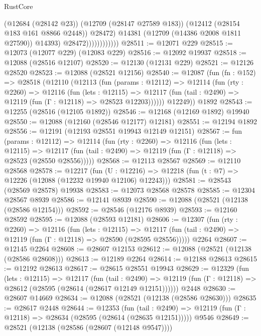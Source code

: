\begin{lexlean}{RustCore}
\begin{coremodule}
                                (@12684 (@28142 @23))
                                (@12709 (@28147 @27589 @183))
                                (@12412 (@28154 @183 @161 @8866 @2448))
                                @28472)
                              @14381
                              (@12709 (@14386 @2008 @1811 @27590))
                              @14393)
                            @28472))))))))))))
@28511 := @12071 @229
@28515 := @12073 (@12077 @229) (@12083 @229)
@28516 := @12092 @19937
@28518 := @12088 (@28516 @12107)
@28520 := @12130 (@12131 @229)
@28521 := @12126 @28520
@28523 := @12088 (@28521 @12156)
@28540 := @12087
    (fun (fn : @152) =>
    @28518
      (@12110
        (@12113
          (fun (params : @12112) =>
          @12114
            (fun (rty : @2260) =>
            @12116
              (fun (lets : @12115) =>
              @12117 (fun (tail : @2490) => @12119 (fun (Γ : @12118) => @28523 @12203))))))
        @12249))
    @1892
@28543 := @12255 (@28516 (@12105 @1892))
@28546 := @12168 (@12169 @1892) @19940
@28550 := @12088 (@12160 (@28546 @12177) @12181)
@28551 := @12194 @1892
@28556 := @12191 (@12193 @28551 @19943 @12149 @12151)
@28567 := fun (params : @12112) =>
  @12114
    (fun (rty : @2260) =>
    @12116
      (fun (lets : @12115) =>
      @12117 (fun (tail : @2490) => @12119 (fun (Γ : @12118) => @28523 (@28550 @28556)))))
@28568 := @12113 @28567
@28569 := @12110 @28568
@28578 := @12217
    (fun (U : @12216) => @12218 (fun (t : @7) => @12226 (@12088 (@12232 @19940 @12106) @12243)))
@28581 := @28543 (@28569 @28578) @19938
@28583 := @12073 @28568 @28578
@28585 := @12304 @28567 @8939
@28586 := @12141 @8939
@28590 := @12088 (@28521 (@12138 (@28586 @12154)))
@28592 := @28546 (@12176 @8939)
@28593 := @12160 @28592
@28595 := @12088 (@28593 @12181)
@28606 := @12307
    (fun (rty : @2260) =>
    @12116
      (fun (lets : @12115) =>
      @12117 (fun (tail : @2490) => @12119 (fun (Γ : @12118) => @28590 (@28595 @28556)))))
    @2264
@28607 := @12145 @2264
@28608 := @28607 @12153
@28612 := @12088 (@28521 (@12138 (@28586 @28608)))
@28613 := @12189 @2264
@28614 := @12188 @28613
@28615 := @12192 @28613
@28617 := @28615 @28551 @19943
@28629 := @12329
    (fun (lets : @12115) =>
    @12117
      (fun (tail : @2490) =>
      @12119 (fun (Γ : @12118) => @28612 (@28595 (@28614 (@28617 @12149 @12151))))))
    @2448
@28630 := @28607 @14669
@28634 := @12088 (@28521 (@12138 (@28586 @28630)))
@28635 := @28617 @2448
@28644 := @12353
    (fun (tail : @2490) => @12119 (fun (Γ : @12118) => @28634 (@28595 (@28614 (@28635 @12151)))))
    @9546
@28649 := @28521 (@12138 (@28586 (@28607 (@12148 @9547))))

\end{coremodule}
\end{lexlean}
